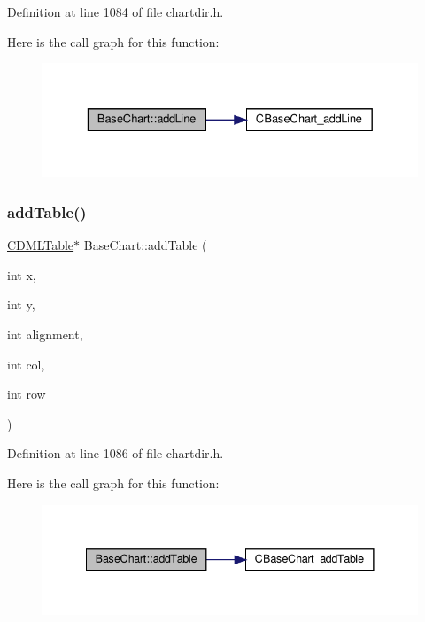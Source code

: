 Definition at line 1084 of file chartdir.\+h.

Here is the call graph for this function\+:
\nopagebreak
\begin{figure}[H]
\begin{center}
\leavevmode
\includegraphics[width=329pt]{class_base_chart_aef7dd1cbac801d351327e917de4130c7_cgraph}
\end{center}
\end{figure}
\mbox{\label{class_base_chart_ac54ec67149fa1573b524aa2d9efc11ff}} 
\subsubsection{\texorpdfstring{add\+Table()}{addTable()}}
{\footnotesize\ttfamily \hyperlink{class_c_d_m_l_table}{C\+D\+M\+L\+Table}$\ast$ Base\+Chart\+::add\+Table (\begin{DoxyParamCaption}\item[{int}]{x,  }\item[{int}]{y,  }\item[{int}]{alignment,  }\item[{int}]{col,  }\item[{int}]{row }\end{DoxyParamCaption})\hspace{0.3cm}{\ttfamily [inline]}}



Definition at line 1086 of file chartdir.\+h.

Here is the call graph for this function\+:
\nopagebreak
\begin{figure}[H]
\begin{center}
\leavevmode
\includegraphics[width=341pt]{class_base_chart_ac54ec67149fa1573b524aa2d9efc11ff_cgraph}
\end{center}
\end{figure}
\mbox{\label{class_base_chart_a2a2016142a7036736cc0c3ffd43a5d80}} 
